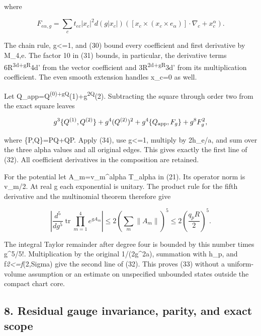\documentclass[
  11pt,
]{article}
\begin{document}
where

\[
 F_{e\alpha,g}=\sum_ct_{ec}|x_c|^2d(g|x_c|)
       \left([x_c\times(x_c\times e_\alpha)]\cdot\nabla_c
                                +x_c^\alpha\right).
\]

The chain rule, g\textless=1, and (30) bound every coefficient and first
derivative by M\_4,e. The factor 10 in (31) bounds, in particular, the
derivative terms
6R\textsuperscript{3\textbar d\textbar+gR}4\textbar d'\textbar{} from
the vector coefficient and
3R\textsuperscript{2\textbar d\textbar+gR}3\textbar d'\textbar{} from
its multiplication coefficient. The even smooth extension handles x\_c=0
as well.

Let Q\_app=Q\textsuperscript{(0)+gQ}(1)+g\textsuperscript{2Q}(2).
Subtracting the square through order two from the exact square leaves

\[
 g^3\{Q^{(1)},Q^{(2)}\}+g^4(Q^{(2)})^2
       +g^4\{Q_{\rm app},F_g\}+g^8F_g^2,
\]

where \{P,Q\}=PQ+QP. Apply (34), use g\textless=1, multiply by
2\textbar h\_e\textbar/a, and sum over the three alpha values and all
original edges. This gives exactly the first line of (32). All
coefficient derivatives in the composition are retained.

For the potential let A\_m=v\_m\^{}alpha T\_alpha in (21). Its operator
norm is \textbar v\_m\textbar/2. At real g each exponential is unitary.
The product rule for the fifth derivative and the multinomial theorem
therefore give

\[
 \left|\frac{d^5}{dg^5}\operatorname{tr}
                   \prod_{m=1}^4e^{gA_m}\right|
 \le2\left(\sum_m\|A_m\|\right)^5
 \le2\left(\frac{q_pR}{2}\right)^5.
\]

The integral Taylor remainder after degree four is bounded by this
number times g\^{}5/5!. Multiplication by the original 1/(2g\^{}2a),
summation with \textbar h\_p\textbar, and
\textbar\textbar f\textbar\textbar{}\emph{2\textless=\textbar\textbar f\textbar\textbar{}}(2,Sigma)
give the second line of (32). This proves (33) without a uniform-volume
assumption or an estimate on unspecified unbounded states outside the
compact chart core.

\subsection{8. Residual gauge invariance, parity, and exact
scope}\label{weak-coupling-part-14-residual-gauge-invariance-parity-and-exact-scope}
\end{document}
